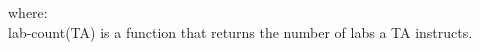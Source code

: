\documentclass{article}
\begin{document}
\begin{appendices}
\begin{enumerate}
    where:\\ lab-count(TA) is a function that returns the number of labs
    a TA instructs.\\

  \end{enumerate}

\end{appendices}
\end{document}

